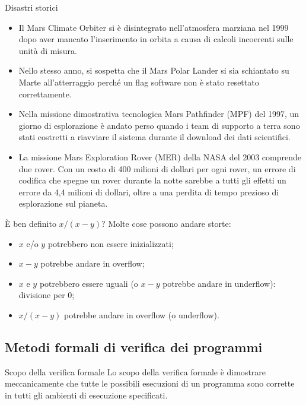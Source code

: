 \begin{esempio}{Disastri storici}{}
\begin{itemize}
    \item Il Mars Climate Orbiter si è disintegrato nell'atmosfera marziana
    nel 1999 dopo aver mancato l'inserimento in orbita a causa di calcoli
    incoerenti sulle unità di misura.
    \item Nello stesso anno, si sospetta che il Mars Polar Lander si sia
    schiantato su Marte all'atterraggio perché un flag software non è stato
    resettato correttamente.
    \item Nella missione dimostrativa tecnologica Mars Pathfinder (MPF) del
    1997, un giorno di esplorazione è andato perso quando i team di supporto a
    terra sono stati costretti a riavviare il sistema durante il download dei
    dati scientifici.
    \item La missione Mars Exploration Rover (MER) della NASA del 2003
    comprende due rover. Con un costo di 400 milioni di dollari per ogni
    rover, un errore di codifica che spegne un rover durante la notte sarebbe
    a tutti gli effetti un errore da 4,4 milioni di dollari, oltre a una
    perdita di tempo prezioso di esplorazione sul pianeta.
\end{itemize}
\end{esempio}

\begin{esempio}{È ben definito $x/(x-y)$?}{}
Molte cose possono andare storte:
\begin{itemize}
    \item $x$ e/o $y$ potrebbero non essere inizializzati;
    \item $x-y$ potrebbe andare in overflow;
    \item $x$ e $y$ potrebbero essere uguali (o $x-y$ potrebbe andare in underflow):
    divisione per 0;
    \item $x/(x-y)$ potrebbe andare in overflow (o underflow).
\end{itemize}
\end{esempio}

\subsection{Metodi formali di verifica dei programmi}

\begin{definizione}{Scopo della verifica formale}{}
Lo scopo della verifica formale è dimostrare meccanicamente che tutte le
possibili esecuzioni di un programma sono corrette in tutti gli ambienti di
esecuzione specificati.
\end{definizione}

